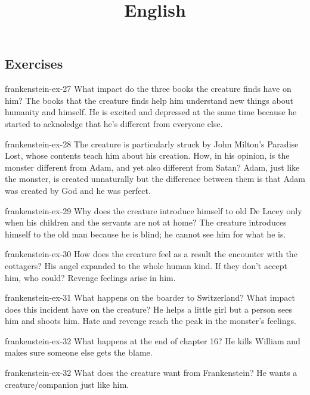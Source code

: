 \documentclass[preview]{standalone}
\begin{document}
\title{English}
\genpage

\subsection{Exercises}

\begin{snippetexercise}{frankenstein-ex-27}
    {What impact do the three books the creature finds have on him?}
    The books that the creature finds help him understand new things
    about humanity and himself. He is excited and depressed at the same time because
    he started to acknoledge that he's different from everyone else.
\end{snippetexercise}

\begin{snippetexercise}{frankenstein-ex-28}
    {The creature is particularly struck by John Milton's Paradise Lost, whose contents teach him about his
    creation. How, in his opinion, is the monster different from Adam, and yet also different from Satan?}
    Adam, just like the monster, is created unnaturally but the difference
    between them is that Adam was created by God and he was perfect. 
\end{snippetexercise}

\begin{snippetexercise}{frankenstein-ex-29}
    {Why does the creature introduce himself to old De Lacey only when his children and the servants are not
    at home?}
    The creature introduces himself to the old man because he is blind; he cannot see him
    for what he is.
\end{snippetexercise}

\begin{snippetexercise}{frankenstein-ex-30}
    {How does the creature feel as a result the encounter with the cottagers?}
    His angel expanded to the whole human kind.
    If they don't accept him, who could? Revenge feelings
    arise in him. 
\end{snippetexercise}

\begin{snippetexercise}{frankenstein-ex-31}
    {What happens on the boarder to Switzerland? What impact does this incident have on the creature?}
    He helps a little girl but a person sees him and shoots him.
    Hate and revenge reach the peak in the monster's feelings.
\end{snippetexercise}

\begin{snippetexercise}{frankenstein-ex-32}
    {What happens at the end of chapter 16?}
    He kills William and makes sure someone else gets the blame.
\end{snippetexercise}

\begin{snippetexercise}{frankenstein-ex-32}
    {What does the creature want from Frankenstein?}
    He wants a creature/companion just like him.
\end{snippetexercise}
\end{document}
